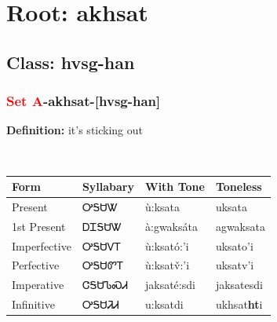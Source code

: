 \needspace{4in}
\section*{Root: akhsat}
\nopagebreak
{}
\needspace{3in}
\subsection*{Class: hvsg-han}
\nopagebreak
\needspace{2in}
\subsubsection*{\textcolor{Red}{Set A}{-}\textbf{akhsat}{-}[hvsg-han]}
\nopagebreak
\textbf{Definition: } it{\textquoteright}s sticking out
\\[0.5em]
\begin{tabularx}{\textwidth}{l X X X}%
\toprule%
\textbf{Form}&\textbf{Syllabary}&\textbf{With Tone}&\textbf{Toneless}\\%
\midrule%
Present&ᎤᎦᏌᏔ&ù:ksata&uksata\\%
1st Present&ᎠᏆᎦᏌᏔ&à:gwaksáta&agwaksata\\%
Imperfective&ᎤᎦᏌᏙᎢ&ù:ksató:’i&uksato{\textquoteright}i\\%
Perfective&ᎤᎦᏌᏛᎢ&ù:ksatv̌:’i&uksatv{\textquoteright}i\\%
Imperative&ᏣᎦᏌᏖᏍᏗ&jaksaté:sdi&jaksatesdi\\%
Infinitive&ᎤᎦᏌᏘᏗ&u:ksatdi&ukhsat\textbf{ht}i\\%
\bottomrule%
\end{tabularx}
\\[1em]